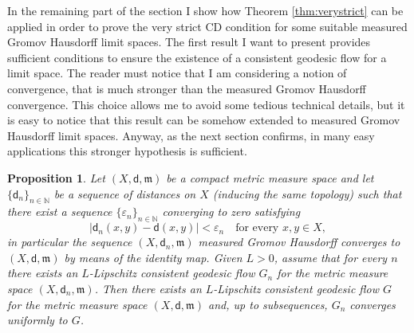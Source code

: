 \documentclass[11pt,twoside,a4paper]{article}
\newcommand{\setN}{\mathbb{N}}
\newcommand{\di}{\mathsf d} %
\newcommand{\m}{\mathfrak m} %
\theoremstyle{theorem}
\newtheorem{prop}[theorem]{Proposition}
\theoremstyle{definition}
\theoremstyle{remark}
\theoremstyle{proof}
\begin{document}
In the remaining part of the section I show how Theorem \ref{thm:verystrict} can be applied in order to prove the very strict CD condition for some suitable measured Gromov Hausdorff limit spaces. The first result I want to present provides sufficient conditions to ensure the existence of a consistent geodesic flow for a limit space. The reader must notice that I am considering a notion of convergence, that is much stronger than the measured Gromov Hausdorff convergence. This choice allows me to avoid some tedious technical details, but it is easy to notice that this result can be somehow extended to measured Gromov Hausdorff limit spaces. Anyway, as the next section confirms, in many easy applications this stronger hypothesis is sufficient.  

\begin{prop}\label{prop:ngf}
Let $(X,\di, \m)$ be a compact metric measure space and let $\{\di_n\}_{n\in \setN}$ be a sequence of distances on $X$ (inducing the same topology) such that there exist a sequence $\{\varepsilon_n\}_{n\in \setN}$ converging to zero satisfying  
\begin{equation*}
   | \di_n(x,y)-\di(x,y)| < \varepsilon_n \quad \text{for every } x,y\in X,
\end{equation*}
in particular the sequence $(X,\di_n,\m)$ measured Gromov Hausdorff converges to $(X,\di, \m)$ by means of the identity map. Given $L>0$, assume that for every $n$ there exists an $L$-Lipschitz consistent geodesic flow $G_n$ for the metric measure space $(X,\di_n, \m)$. Then there exists an $L$-Lipschitz consistent geodesic flow $G$ for the metric measure space $(X,\di, \m)$ and, up to subsequences, $G_n$ converges uniformly to $G$. 
\end{prop}
\end{document}
